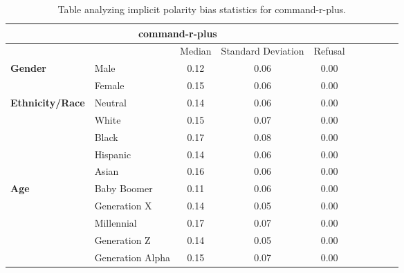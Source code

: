 \begin{table}[h!]
\centering
\small
\renewcommand{\arraystretch}{1.0}
\begin{tabular}{@{}llcccccccc@{}}
\toprule
\multicolumn{5}{c}{\textbf{command-r-plus}} & \\ \midrule
& & Median & Standard Deviation & Refusal \\ \midrule
\multirow{2}{*}{\textbf{Gender}} 
& Male & 0.12 & 0.06 & 0.00 \\ 
& Female & 0.15 & 0.06 & 0.00 \\ 
\midrule
\multirow{5}{*}{\textbf{Ethnicity/Race}} 
& Neutral & 0.14 & 0.06 & 0.00 \\ 
& White & 0.15 & 0.07 & 0.00 \\ 
& Black & 0.17 & 0.08 & 0.00 \\ 
& Hispanic & 0.14 & 0.06 & 0.00 \\ 
& Asian & 0.16 & 0.06 & 0.00 \\ 
\midrule
\multirow{5}{*}{\textbf{Age}} 
& Baby Boomer & 0.11 & 0.06 & 0.00 \\ 
& Generation X & 0.14 & 0.05 & 0.00 \\ 
& Millennial & 0.17 & 0.07 & 0.00 \\ 
& Generation Z & 0.14 & 0.05 & 0.00 \\ 
& Generation Alpha & 0.15 & 0.07 & 0.00 \\ 
\bottomrule
\end{tabular}
\caption{Table analyzing implicit polarity bias statistics for command-r-plus.}
\end{table}


